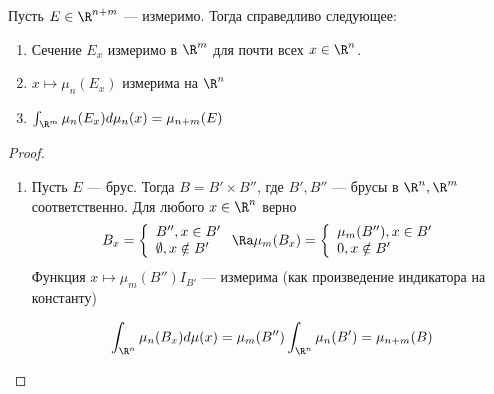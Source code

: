 \begin{theorem}
    Пусть \(E \in \R^{n + m}\) --- измеримо. Тогда справедливо следующее:
    \begin{enumerate}
        \item Сечение \(E_x\) измеримо в \(\R^m\) для почти всех \(x \in \R^n\).
        \item \(x \mapsto \mu_n(E_x)\) измерима на \(\R^n\)
        \item \(\int_{\R^m}\mu_n(E_x)d\mu_n(x) = \mu_{n + m}(E)\)
    \end{enumerate}
\end{theorem}
\begin{proof}
    \begin{enumerate}
        \item Пусть \(E\) --- брус. Тогда \(B = B' \times B''\), где \(B', B''\) --- брусы в \(\R^n, \R^m\) соответственно. Для любого \(x \in \R^n\) верно 
        \[B_x = \left\{\begin{array}{ll}
            B'', x \in B' \\
            \emptyset, x \notin B'
        \end{array}\right. \Ra \mu_m(B_x) = \left\{\begin{array}{ll}
            \mu_m(B''), x \in B' \\
            0, x \notin B'
        \end{array}\right.\]
        Функция \(x \mapsto \mu_m(B'') I_{B'}\) --- измерима (как произведение индикатора на константу)

        \[\int_{\R^n} \mu_n(B_x) d\mu(x) = \mu_m(B'')\int_{\R^n}\mu_n(B') = \mu_{n + m}(B)\]


\end{enumerate}
\end{proof}
